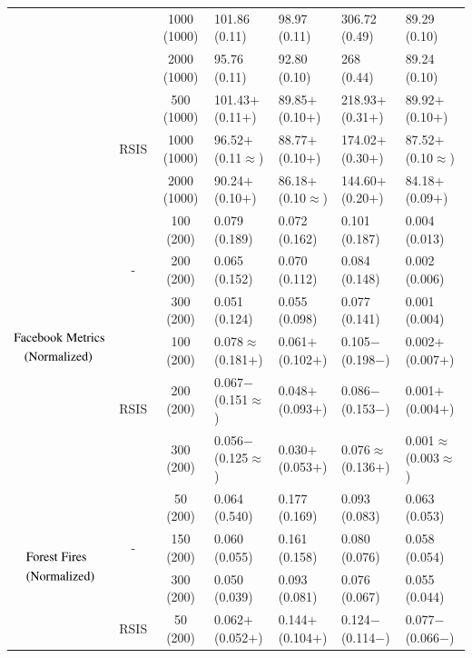 \documentclass[final,3p,times]{elsarticle}
\begin{document}
\begin{table}
\begin{tabularx}{\textwidth}{cccXXXX}
    &  & 1000 (1000) & 101.86 (0.11) & 98.97 (0.11) & 306.72 (0.49) & 89.29 (0.10) \\
    &  & 2000 (1000) & 95.76 (0.11) & 92.80 (0.10) & 268 (0.44) & 89.24 (0.10) \\
  \cmidrule{2-7}
    & \multirow{3}{*}{RSIS} & 500 (1000) & 101.43$+$ (0.11$+$) & 89.85$+$ (0.10$+$) & 218.93$+$ (0.31$+$) & 89.92$+$ (0.10$+$) \\
    &  & 1000 (1000) & 96.52$+$ (0.11$\approx$) & 88.77$+$ (0.10$+$) & 174.02$+$ (0.30$+$) & 87.52$+$ (0.10$\approx$) \\
    &  & 2000 (1000) & 90.24$+$ (0.10$+$) & 86.18$+$ (0.10$\approx$) & 144.60$+$ (0.20$+$) & 84.18$+$ (0.09$+$) \\
  \cmidrule{1-7}
  \multirow{6}{*}{$\begin{aligned}&\text{Facebook\;Metrics}\\&\;\;\;\text{(Normalized)} \end{aligned}$} & \multirow{3}{*}{-} & 100 (200) & 0.079 (0.189) & 0.072 (0.162) & 0.101 (0.187) & 0.004 (0.013) \\
    &  & 200 (200) & 0.065 (0.152) & 0.070 (0.112) & 0.084 (0.148) & 0.002 (0.006) \\
    &  & 300 (200) & 0.051 (0.124) & 0.055 (0.098) & 0.077 (0.141) & 0.001 (0.004) \\
  \cmidrule{2-7}
    & \multirow{3}{*}{RSIS} & 100 (200) & 0.078$\approx$ (0.181$+$) & 0.061$+$ (0.102$+$) & 0.105$-$ (0.198$-$) & 0.002$+$ (0.007$+$) \\
    &  & 200 (200) & 0.067$-$ (0.151$\approx$) & 0.048$+$ (0.093$+$) & 0.086$-$ (0.153$-$) & 0.001$+$ (0.004$+$) \\
    &  & 300 (200) & 0.056$-$ (0.125$\approx$) & 0.030$+$ (0.053$+$) & 0.076$\approx$ (0.136$+$) & 0.001$\approx$ (0.003$\approx$) \\
  \cmidrule{1-7}
  \multirow{6}{*}{$\begin{aligned}&\text{Forest\;Fires}\\&\text{(Normalized)}\end{aligned}$} & \multirow{3}{*}{-} & 50 (200) & 0.064 (0.540) & 0.177 (0.169) & 0.093 (0.083) & 0.063 (0.053) \\
    &  & 150 (200) & 0.060 (0.055) & 0.161 (0.158) & 0.080 (0.076) & 0.058 (0.054) \\
    &  & 300 (200) & 0.050 (0.039) & 0.093 (0.081) & 0.076 (0.067) & 0.055 (0.044) \\
  \cmidrule{2-7} 
    & \multirow{3}{*}{RSIS} & 50 (200) & 0.062$+$ (0.052$+$) & 0.144$+$ (0.104$+$) & 0.124$-$ (0.114$-$) & 0.077$-$ (0.066$-$) \\

\end{tabularx}
\end{table}
\end{document}
